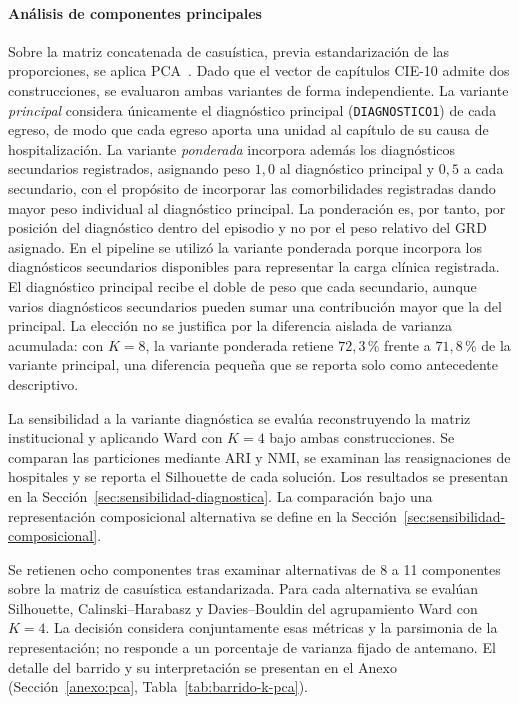 \paragraph{Análisis de componentes principales}
\label{sec:pca-detalle}

Sobre la matriz concatenada de casuística, previa estandarización de las
proporciones, se aplica PCA~\citep{Jolliffe2016}. Dado que el vector de capítulos CIE-10 admite dos
construcciones, se evaluaron ambas variantes de forma independiente. La variante
\emph{principal} considera únicamente el diagnóstico principal
(\texttt{DIAGNOSTICO1}) de cada egreso, de modo que cada egreso aporta una
unidad al capítulo de su causa de hospitalización. La variante \emph{ponderada}
incorpora además los diagnósticos secundarios registrados, asignando peso
$1{,}0$ al diagnóstico principal y $0{,}5$ a cada secundario, con el propósito
de incorporar las comorbilidades registradas dando mayor peso individual
al diagnóstico principal. La ponderación es, por tanto, por posición
del diagnóstico dentro del episodio y no por el peso relativo del GRD asignado.
En el pipeline se utilizó la variante ponderada porque incorpora
los diagnósticos secundarios disponibles para representar la carga clínica
registrada. El diagnóstico principal recibe el doble de peso que cada
secundario, aunque varios diagnósticos secundarios pueden sumar una contribución
mayor que la del principal. La elección no se justifica por la
diferencia aislada de varianza acumulada: con $K=8$, la variante ponderada
retiene $72{,}3\,\%$ frente a $71{,}8\,\%$ de la variante principal, una
diferencia pequeña que se reporta solo como antecedente descriptivo.

La sensibilidad a la variante diagnóstica se evalúa reconstruyendo la matriz
institucional y aplicando Ward con $K=4$ bajo ambas construcciones. Se comparan
las particiones mediante ARI y NMI, se examinan las reasignaciones de hospitales
y se reporta el Silhouette de cada solución. Los resultados se presentan en la
Sección~\ref{sec:sensibilidad-diagnostica}. La comparación bajo una
representación composicional alternativa se define en la
Sección~\ref{sec:sensibilidad-composicional}.

Se retienen ocho componentes tras examinar alternativas de 8 a 11 componentes
sobre la matriz de casuística estandarizada. Para cada alternativa se evalúan
Silhouette, Calinski--Harabasz y Davies--Bouldin del agrupamiento Ward con $K=4$.
La decisión considera conjuntamente esas métricas y la parsimonia de la
representación; no responde a un porcentaje de varianza fijado de antemano.
El detalle del barrido y su interpretación se presentan en el
Anexo (Sección~\ref{anexo:pca}, Tabla~\ref{tab:barrido-k-pca}).

